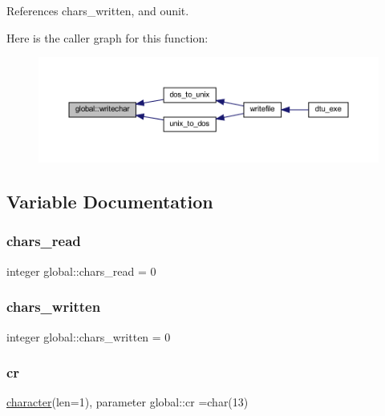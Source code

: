 References chars\+\_\+written, and ounit.

Here is the caller graph for this function\+:
\nopagebreak
\begin{figure}[H]
\begin{center}
\leavevmode
\includegraphics[width=350pt]{namespaceglobal_aa4c95f5c7250975b756bcd2131c3b88c_icgraph}
\end{center}
\end{figure}


\subsection{Variable Documentation}
\mbox{\label{namespaceglobal_a2d038312d6b015cabfbb5716cb61baac}} 
\subsubsection{\texorpdfstring{chars\+\_\+read}{chars\_read}}
{\footnotesize\ttfamily integer global\+::chars\+\_\+read = 0}

\mbox{\label{namespaceglobal_a22f0db93abbbbd8c37f50b829daa00ad}} 
\subsubsection{\texorpdfstring{chars\+\_\+written}{chars\_written}}
{\footnotesize\ttfamily integer global\+::chars\+\_\+written = 0}

\mbox{\label{namespaceglobal_a66654a3eb0e9c862da1f7ca5388b2e83}} 
\subsubsection{\texorpdfstring{cr}{cr}}
{\footnotesize\ttfamily \hyperlink{option__stopwatch_83_8txt_abd4b21fbbd175834027b5224bfe97e66}{character}(len=1), parameter global\+::cr =char(13)}

